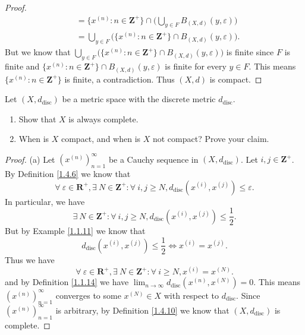 \begin{proof}
\begin{align*}
                                         & = \{x^{(n)} : n \in \mathbf{Z}^+\} \cap \bigg(\bigcup_{y \in F} B_{(X, d)}(y, \varepsilon)\bigg) \\
                                         & = \bigcup_{y \in F} \big(\{x^{(n)} : n \in \mathbf{Z}^+\} \cap B_{(X, d)}(y, \varepsilon)\big).
    \end{align*}
    But we know that \(\bigcup_{y \in F} \big(\{x^{(n)} : n \in \mathbf{Z}^+\} \cap B_{(X, d)}(y, \varepsilon)\big)\) is finite since \(F\) is finite and \(\{x^{(n)} : n \in \mathbf{Z}^+\} \cap B_{(X, d)}(y, \varepsilon)\) is finite for every \(y \in F\).
    This means \(\{x^{(n)} : n \in \mathbf{Z}^+\}\) is finite, a contradiction.
    Thus \((X, d)\) is compact.
\end{proof}

\begin{exercise}\label{ex 1.5.12}
    Let \((X, d_{\text{disc}})\) be a metric space with the discrete metric \(d_{\text{disc}}\).
    \begin{enumerate}
        \item Show that \(X\) is always complete.
        \item When is \(X\) compact, and when is \(X\) not compact?
              Prove your claim.
    \end{enumerate}
\end{exercise}

\begin{proof}{(a)}
    Let \((x^{(n)})_{n = 1}^\infty\) be a Cauchy sequence in \((X, d_{\text{disc}})\).
    Let \(i, j \in \mathbf{Z}^+\).
    By Definition \ref{1.4.6} we know that
    \[
        \forall\ \varepsilon \in \mathbf{R}^+, \exists\ N \in \mathbf{Z}^+ : \forall\ i, j \geq N, d_{\text{disc}}(x^{(i)}, x^{(j)}) \leq \varepsilon.
    \]
    In particular, we have
    \[
        \exists\ N \in \mathbf{Z}^+ : \forall\ i, j \geq N, d_{\text{disc}}(x^{(i)}, x^{(j)}) \leq \frac{1}{2}.
    \]
    But by Example \ref{1.1.11} we know that
    \[
        d_{\text{disc}}(x^{(i)}, x^{(j)}) \leq \frac{1}{2} \iff x^{(i)} = x^{(j)}.
    \]
    Thus we have
    \[
        \forall\ \varepsilon \in \mathbf{R}^+, \exists\ N \in \mathbf{Z}^+ : \forall\ i \geq N, x^{(i)} = x^{(N)}.
    \]
    and by Definition \ref{1.1.14} we have \(\lim_{n \to \infty} d_{\text{disc}}(x^{(n)}, x^{(N)}) = 0\).
    This means \((x^{(n)})_{n = 1}^\infty\) converges to some \(x^{(N)} \in X\) with respect to \(d_{\text{disc}}\).
    Since \((x^{(n)})_{n = 1}^\infty\) is arbitrary, by Definition \ref{1.4.10} we know that \((X, d_{\text{disc}})\) is complete.
\end{proof}

